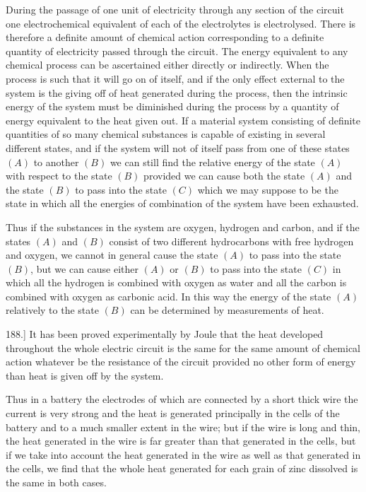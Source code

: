 \documentclass[12pt,oneside]{book}[2021/10/04]
\newcommand{\Runhead}[1]{\fancyhead[C]{\iffloatpage{}{\small#1}}}
\newcommand{\article}[1]{\phantomsection \label{art:#1}{#1.]}}
\newcommand{\¬}{\hphantom{0}}
\begin{document}
During the passage of one unit of electricity through any section
of the circuit one electrochemical equivalent of each of the electrolytes
is electrolysed. There is therefore a definite amount of
chemical action corresponding to a definite quantity of electricity
passed through the circuit. The energy equivalent to any chemical
process can be ascertained either directly or indirectly. When the
process is such that it will go on of itself, and if the only effect
external to the system is the giving off of heat generated during
the process, then the intrinsic energy of the system must be
diminished during the process by a quantity of energy equivalent
to the heat given out. If a material system consisting of definite
quantities of so many chemical substances is capable of existing in
several different states, and if the system will not of itself pass
from one of these states \((A)\) to another \((B)\) we can still find the
relative energy of the state \((A)\) with respect to the state \((B)\)
provided we can cause both the state \((A)\) and the state \((B)\) to
pass into the state \((C)\) which we may suppose to be the state
in which all the energies of combination of the system have been
exhausted.

Thus if the substances in the system are oxygen, hydrogen and
carbon, and if the states \((A)\) and \((B)\) consist of two different
hydrocarbons with free hydrogen and oxygen, we cannot in general
cause the state \((A)\) to pass into the state \((B)\), but we can cause
either \((A)\) or \((B)\) to pass into the state \((C)\) in which all the
hydrogen is combined with oxygen as water and all the carbon
is combined with oxygen as carbonic acid. In this way the
energy of the state \((A)\) relatively to the state \((B)\) can be determined
by measurements of heat.

\article{188} It has been proved experimentally by Joule that the heat
developed throughout the whole electric circuit is the same for the
same amount of chemical action whatever be the resistance of the
circuit provided no other form of energy than heat is given off by
the system.

Thus in a battery the electrodes of which are connected by a
short thick wire the current is very strong and the heat is generated
principally in the cells of the battery and to a much smaller
extent in the wire; but if the wire is long and thin, the heat
generated in the wire is far greater than that generated in the
cells, but if we take into account the heat generated in the wire
as well as that generated in the cells, we find that the whole
heat generated for each grain of zinc dissolved is the same in
both cases.
\Runhead{JOULE'S EXPERIMENTS.}
\end{document}
